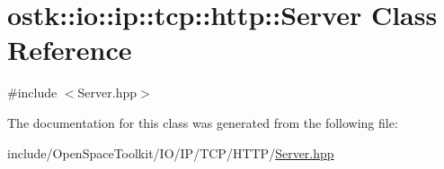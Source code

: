 \hypertarget{classostk_1_1io_1_1ip_1_1tcp_1_1http_1_1_server}{}\section{ostk\+:\+:io\+:\+:ip\+:\+:tcp\+:\+:http\+:\+:Server Class Reference}
\label{classostk_1_1io_1_1ip_1_1tcp_1_1http_1_1_server}


{\ttfamily \#include $<$Server.\+hpp$>$}



The documentation for this class was generated from the following file\+:\begin{DoxyCompactItemize}
\item 
include/\+Open\+Space\+Toolkit/\+I\+O/\+I\+P/\+T\+C\+P/\+H\+T\+T\+P/\hyperlink{_h_t_t_p_2_server_8hpp}{Server.\+hpp}\end{DoxyCompactItemize}
